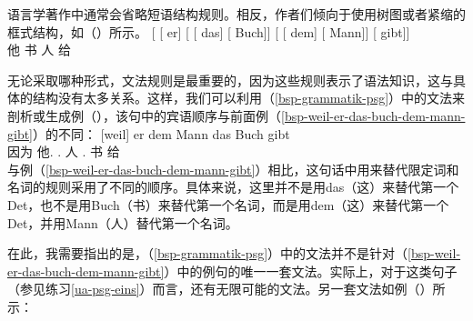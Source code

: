 语言学著作中通常会省略短语结构规则。相反，作者们倾向于使用树图或者紧缩的框式结构，如（）所示。
\ea
\gll {}[ [ er] [ [ das] [ Buch]]  [ [ dem] [ Mann]] [ gibt]]\\
     {}         {}       他  {}        {}         {}      书    {}        {}         {}       人     {}      给\\  
\z

\noindent
无论采取哪种形式，文法规则是最重要的，因为这些规则表示了语法知识，这与具体的结构没有太多关系。这样，我们可以利用（\ref{bsp-grammatik-psg}）中的文法来剖析或生成例（），该句中的宾语顺序与前面例（\ref{bsp-weil-er-das-buch-dem-mann-gibt}）的不同：
\ea
\gll {}[weil] er dem Mann das Buch gibt\\
	 {}\spacebr{}因为 他.\nom{} .\dat{} 人 .\acc{} 书 给\\
\z
与例（\ref{bsp-weil-er-das-buch-dem-mann-gibt}）相比，这句话中用来替代限定词和名词的规则采用了不同的顺序。具体来说，这里并不是用das（这）来替代第一个Det，也不是用Buch（书）来替代第一个名词，而是用dem（这）来替代第一个Det，并用Mann（人）替代第一个名词。

在此，我需要指出的是，（\ref{bsp-grammatik-psg}）中的文法并不是针对（\ref{bsp-weil-er-das-buch-dem-mann-gibt}）中的例句的唯一一套文法。实际上，对于这类句子（参见练习\ref{ua-psg-eins}）而言，还有无限\label{page-unendlich-viele-grammatiken}可能的文法。另一套文法如例（）所示：

